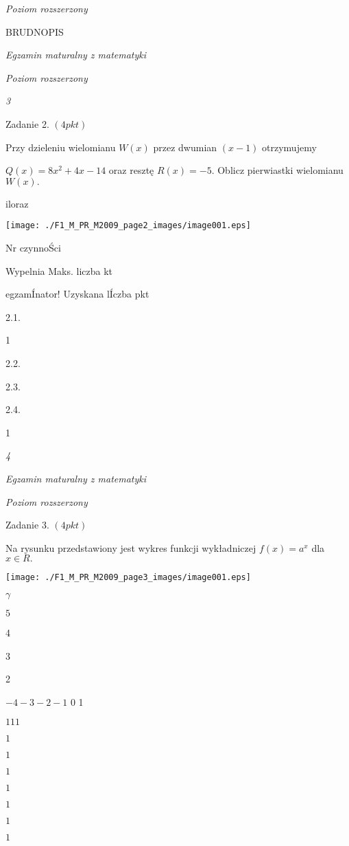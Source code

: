 \documentclass[a4paper,12pt]{article}
\begin{document}
{\it Poziom rozszerzony}

BRUDNOPIS





{\it Egzamin maturalny z matematyki}

{\it Poziom rozszerzony}

{\it 3}

Zadanie 2. $(4pkt)$

Przy dzieleniu wielomianu $W(x)$ przez dwumian $(x-1)$ otrzymujemy

$Q(x)=8x^{2}+4x-14$ oraz resztę $R(x)=-5$. Oblicz pierwiastki wielomianu $W(x).$

iloraz
\begin{center}
\texttt{[image: ./F1\_M\_PR\_M2009\_page2\_images/image001.eps]}
\end{center}
Nr czynnoŚci

Wypelnia Maks. liczba kt

egzamÍnator! Uzyskana lÍczba pkt

2.1.

1

2.2.

2.3.

2.4.

1





{\it 4}

{\it Egzamin maturalny z matematyki}

{\it Poziom rozszerzony}

Zadanie 3. $(4pkt)$

Na rysunku przedstawiony jest wykres funkcji wykładniczej $f(x)=a^{x}$ dla $x\in R.$
\begin{center}
\texttt{[image: ./F1\_M\_PR\_M2009\_page3\_images/image001.eps]}
\end{center}
$\gamma$

$5$

4

3

2

$-4 -3  -2 -1$  0 1

$111$

$1$

$1$

$1$

$1$

$1$

$1$

$1$
\end{document}
